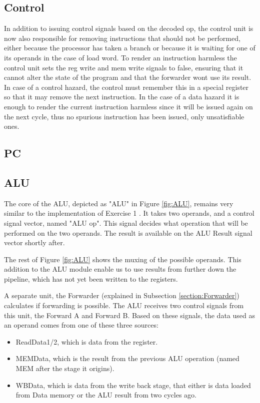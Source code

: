 \subsection{Control}
In addition to issuing control signals based on the decoded op, the control unit is now also responsible for removing instructions that should not be performed, either because the processor has taken a branch or because it is waiting for one of its operands in the case of load word.
To render an instruction harmless the control unit sets the reg write and mem write signals to false, ensuring that it cannot alter the state of the program and that the forwarder wont use its result.
In case of a control hazard, the control must remember this in a special register so that it may remove the next instruction. 
In the case of a data hazard it is enough to render the current instruction harmless since it will be issued again on the next cycle, thus no spurious instruction has been issued, only unsatisfiable ones.


\subsection{PC}

\subsection{ALU}
The core of the ALU, depicted as "ALU" in Figure \ref{fig:ALU}, remains very similar to the implementation of Exercise 1 \cite{ex1report}. It takes two operands, and a control signal vector, named "ALU op". This signal decides what operation that will be performed on the two operands. The result is available on the ALU Result signal vector shortly after.

The rest of Figure \ref{fig:ALU} shows the muxing of the possible operands. This addition to the ALU module enable us to use results from further down the pipeline, which has not yet been written to the registers.

A separate unit, the Forwarder (explained in Subsection \ref{section:Forwarder}) calculates if forwarding is possible. The ALU receives two control signals from this unit, the Forward A and Forward B.
Based on these signals, the data used as an operand comes from one of these three sources:
\begin{itemize}
\item ReadData1/2, which is data from the register.
\item MEMData, which is the result from the previous ALU operation (named MEM after the stage it origins).
\item WBData, which is data from the write back stage, that either is data loaded from Data memory or the ALU result from two cycles ago.
\end{itemize}
 
